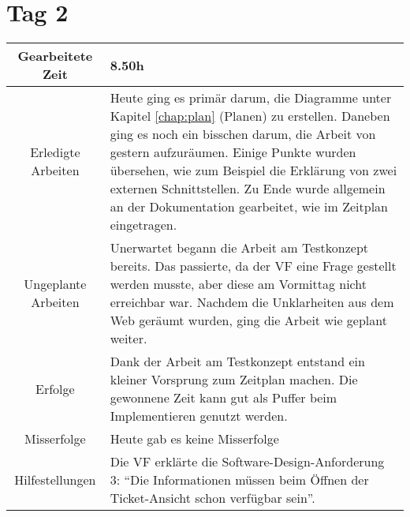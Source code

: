 \section{Tag 2}
\begin{tabularx}{\textwidth}[H]{|c|X|}
  \hline
  Gearbeitete Zeit & 8.50h \\ \hline
  Erledigte Arbeiten & Heute ging es primär darum, die Diagramme unter Kapitel \ref{chap:plan}
  (Planen) zu erstellen. Daneben ging es noch ein bisschen darum, die Arbeit von gestern
  aufzuräumen. Einige Punkte wurden übersehen, wie zum Beispiel die Erklärung von zwei
  externen Schnittstellen. Zu Ende wurde allgemein an der Dokumentation gearbeitet, wie
  im Zeitplan eingetragen. \\ \hline
  Ungeplante Arbeiten & Unerwartet begann die Arbeit am Testkonzept bereits. Das passierte,
  da der VF eine Frage gestellt werden musste, aber diese am Vormittag nicht erreichbar war. Nachdem
  die Unklarheiten aus dem Web geräumt wurden, ging die Arbeit wie geplant weiter.
  \\ \hline
  Erfolge & Dank der Arbeit am Testkonzept entstand ein kleiner Vorsprung zum
  Zeitplan machen. Die gewonnene Zeit kann gut als Puffer beim Implementieren genutzt werden.
  \\ \hline
  Misserfolge & Heute gab es keine Misserfolge \\ \hline
  Hilfestellungen & Die VF erklärte die Software-Design-Anforderung 3: \enquote{Die 
  Informationen müssen beim Öffnen der Ticket-Ansicht schon verfügbar sein}.  \\ \hline
\end{tabularx}

\newpage

